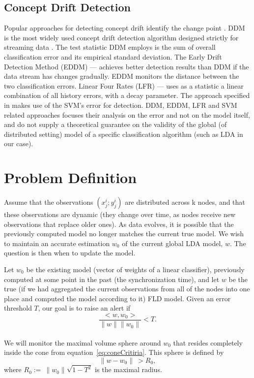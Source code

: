 \documentclass[11pt,twocolumn,varwidth=true,a4paper,fleqn]{article}
\begin{document}
\subsection{Concept Drift Detection}

Popular approaches for detecting concept drift identify the change point
\cite{gama2004learning,wang2013concept}. DDM is the most widely used concept 
drift detection algorithm designed strictly for streaming data 
\cite{gama2004learning}. The test statistic DDM employs is the sum of 
overall classification error and its empirical standard deviation. The Early
Drift Detection Method (EDDM) \cite{baena2006early} --- achieves better
detection results than DDM if the data stream has changes gradually.
EDDM monitors the distance between the two classification errors. 
Linear Four Rates (LFR) \cite{wang2015concept} --- uses as a statistic a linear
combination of all history errors, with a decay parameter. The approach 
specified in \cite{klinkenberg2000detecting,dries2009adaptive} makes use of
the SVM's error for detection. DDM, EDDM, LFR and SVM related approaches focuses
their analysis on the error and not on the model itself, and do not supply a
theoretical guarantee on the validity of the global (of distributed setting) 
model of a specific classification algorithm (such as LDA in our case).

 

\section{Problem Definition}
Assume that the observations ${(x^i_j; y^i_j)}$ are distributed across k nodes, 
and that these observations are dynamic (they change over time, as nodes receive 
new observations that replace older ones). As data evolves, it is possible that
the previously computed model no longer matches the current true model. We wish to maintain 
an accurate estimation $w_0$ of the current global LDA model, $w$. 
The question is then when to update the model.

Let $w_0$ be the existing model (vector of weights of a linear classifier), 
previously computed at some point in the past (the synchronization time), 
and let $w$ be the true (if we had aggregated the current observations 
from all of the nodes into one place and computed the model according to it) FLD model. 
Given an error threshold $T$, our goal is to raise an alert if
\begin{equation} \label{eq:coneCritiria}
\frac{<w,w_0>}{\parallel w \parallel \parallel w_0 \parallel}  < T.
\end{equation}
\\We will monitor the maximal volume sphere around $w_0$ that resides completely
inside the cone from equation~\ref{eq:coneCritiria}. This sphere is
defined by
\begin{equation} \label{eq:critiria}
\parallel w-w_0 \parallel \  >  R_0,
\end{equation}
where $R_0 := \  \parallel w_0 \parallel \sqrt{1-T^2}$ is the maximal radius.
\end{document}
